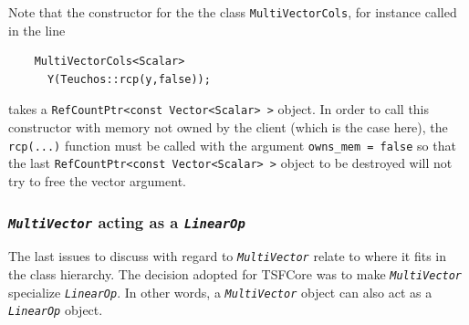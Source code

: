 {}\noindent{}Note that the constructor for the the class
{}\texttt{MultiVectorCols}, for instance called in the line

{\scriptsize\begin{verbatim}
    MultiVectorCols<Scalar>
      Y(Teuchos::rcp(y,false));
\end{verbatim}}

{}\noindent{}takes a {}\texttt{RefCountPtr<const Vector<Scalar> >}
object.  In order to call this constructor with memory not owned by
the client (which is the case here), the {}\texttt{rcp(...)} function
must be called with the argument {}\texttt{owns\_mem = false} so that
the last {}\texttt{RefCountPtr<const Vector<Scalar> >} object to be
destroyed will not try to free the vector argument.

%
\subsubsection{\texttt{\textit{Multi\-Vector}} acting as a {}\texttt{\textit{LinearOp}}}
\label{tsfcore:sec:multi_vec_linear_op}
%

The last issues to discuss with regard to
{}\texttt{\textit{Multi\-Vector}} relate to where it fits in the class
hierarchy.  The decision adopted for TSFCore was to make
{}\texttt{\textit{Multi\-Vector}} specialize
{}\texttt{\textit{LinearOp}}.  In other words, a
{}\texttt{\textit{Multi\-Vector}} object can also act as a
{}\texttt{\textit{LinearOp}} object.

